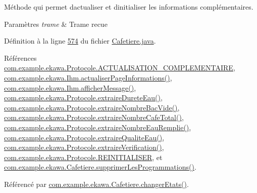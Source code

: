 Méthode qui permet d\textquotesingle{}actualiser et d\textquotesingle{}initialiser les informations complémentaires. 


\begin{DoxyParams}{Paramètres}
{\em trame} & Trame recue \\
\hline
\end{DoxyParams}


Définition à la ligne \hyperlink{_cafetiere_8java_source_l00574}{574} du fichier \hyperlink{_cafetiere_8java_source}{Cafetiere.\+java}.



Références \hyperlink{_protocole_8java_source_l00036}{com.\+example.\+ekawa.\+Protocole.\+A\+C\+T\+U\+A\+L\+I\+S\+A\+T\+I\+O\+N\+\_\+\+C\+O\+M\+P\+L\+E\+M\+E\+N\+T\+A\+I\+RE}, \hyperlink{_ihm_8java_source_l00919}{com.\+example.\+ekawa.\+Ihm.\+actualiser\+Page\+Informations()}, \hyperlink{_ihm_8java_source_l00964}{com.\+example.\+ekawa.\+Ihm.\+afficher\+Message()}, \hyperlink{_protocole_8java_source_l00394}{com.\+example.\+ekawa.\+Protocole.\+extraire\+Durete\+Eau()}, \hyperlink{_protocole_8java_source_l00360}{com.\+example.\+ekawa.\+Protocole.\+extraire\+Nombre\+Bac\+Vide()}, \hyperlink{_protocole_8java_source_l00343}{com.\+example.\+ekawa.\+Protocole.\+extraire\+Nombre\+Cafe\+Total()}, \hyperlink{_protocole_8java_source_l00377}{com.\+example.\+ekawa.\+Protocole.\+extraire\+Nombre\+Eau\+Remplie()}, \hyperlink{_protocole_8java_source_l00411}{com.\+example.\+ekawa.\+Protocole.\+extraire\+Qualite\+Eau()}, \hyperlink{_protocole_8java_source_l00440}{com.\+example.\+ekawa.\+Protocole.\+extraire\+Verification()}, \hyperlink{_protocole_8java_source_l00031}{com.\+example.\+ekawa.\+Protocole.\+R\+E\+I\+N\+I\+T\+I\+A\+L\+I\+S\+ER}, et \hyperlink{_cafetiere_8java_source_l00834}{com.\+example.\+ekawa.\+Cafetiere.\+supprimer\+Les\+Programmations()}.



Référencé par \hyperlink{_cafetiere_8java_source_l00463}{com.\+example.\+ekawa.\+Cafetiere.\+changer\+Etats()}.


